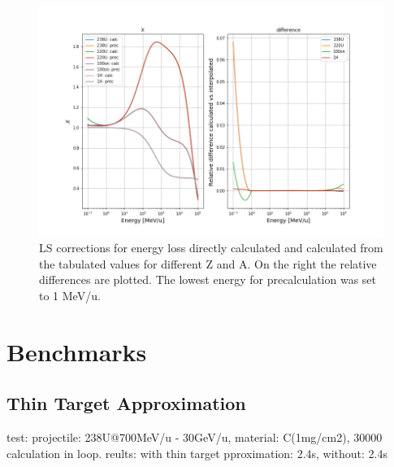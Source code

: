 \documentclass[12pt,a4paper]{article}
\begin{document}
\begin{figure}
\centering
\includegraphics[width=12cm]{plots/lsX_precision.png}
\caption{LS corrections for energy loss directly calculated and calculated from the tabulated values for different Z and A. On the right the relative differences are plotted. The lowest energy for precalculation was set to 1 MeV/u.}
\label{lsX_prec}
\end{figure}




\section{Benchmarks}
\subsection{Thin Target Approximation}
test: projectile: 238U@700MeV/u - 30GeV/u, material: C(1mg/cm2), 30000 calculation in loop.
reults: with thin target pproximation: 2.4s, without: 2.4s
	
\end{document}
